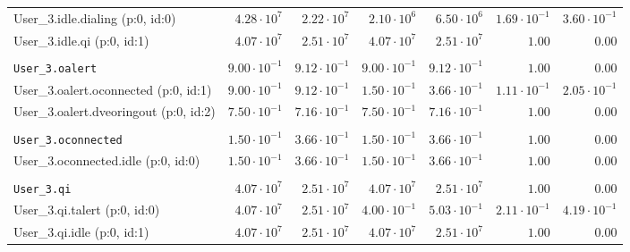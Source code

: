 \begin{table}[htbp]
{\begin{tabular}{lrrrrrr}
\hspace{3mm}User\_3.idle.dialing (p:0, id:0)          &  $4.28 \cdot 10^{7}$ &  $2.22 \cdot 10^{7}$ &  $2.10 \cdot 10^{6}$ &  $6.50 \cdot 10^{6}$ & $1.69 \cdot 10^{-1}$ & $3.60 \cdot 10^{-1}$ \\
\hspace{3mm}User\_3.idle.qi (p:0, id:1)               &  $4.07 \cdot 10^{7}$ &  $2.51 \cdot 10^{7}$ &  $4.07 \cdot 10^{7}$ &  $2.51 \cdot 10^{7}$ &               $1.00$ &               $0.00$ \\
\\[-8pt]\texttt{User\_3.oalert}                       & $9.00 \cdot 10^{-1}$ & $9.12 \cdot 10^{-1}$ & $9.00 \cdot 10^{-1}$ & $9.12 \cdot 10^{-1}$ &               $1.00$ &               $0.00$ \\
\hspace{3mm}User\_3.oalert.oconnected (p:0, id:1)     & $9.00 \cdot 10^{-1}$ & $9.12 \cdot 10^{-1}$ & $1.50 \cdot 10^{-1}$ & $3.66 \cdot 10^{-1}$ & $1.11 \cdot 10^{-1}$ & $2.05 \cdot 10^{-1}$ \\
\hspace{3mm}User\_3.oalert.dveoringout (p:0, id:2)    & $7.50 \cdot 10^{-1}$ & $7.16 \cdot 10^{-1}$ & $7.50 \cdot 10^{-1}$ & $7.16 \cdot 10^{-1}$ &               $1.00$ &               $0.00$ \\
\\[-8pt]\texttt{User\_3.oconnected}                   & $1.50 \cdot 10^{-1}$ & $3.66 \cdot 10^{-1}$ & $1.50 \cdot 10^{-1}$ & $3.66 \cdot 10^{-1}$ &               $1.00$ &               $0.00$ \\
\hspace{3mm}User\_3.oconnected.idle (p:0, id:0)       & $1.50 \cdot 10^{-1}$ & $3.66 \cdot 10^{-1}$ & $1.50 \cdot 10^{-1}$ & $3.66 \cdot 10^{-1}$ &               $1.00$ &               $0.00$ \\
\\[-8pt]\texttt{User\_3.qi}                           &  $4.07 \cdot 10^{7}$ &  $2.51 \cdot 10^{7}$ &  $4.07 \cdot 10^{7}$ &  $2.51 \cdot 10^{7}$ &               $1.00$ &               $0.00$ \\
\hspace{3mm}User\_3.qi.talert (p:0, id:0)             &  $4.07 \cdot 10^{7}$ &  $2.51 \cdot 10^{7}$ & $4.00 \cdot 10^{-1}$ & $5.03 \cdot 10^{-1}$ & $2.11 \cdot 10^{-1}$ & $4.19 \cdot 10^{-1}$ \\
\hspace{3mm}User\_3.qi.idle (p:0, id:1)               &  $4.07 \cdot 10^{7}$ &  $2.51 \cdot 10^{7}$ &  $4.07 \cdot 10^{7}$ &  $2.51 \cdot 10^{7}$ &               $1.00$ &               $0.00$ \\

\end{tabular}}
\end{table}
